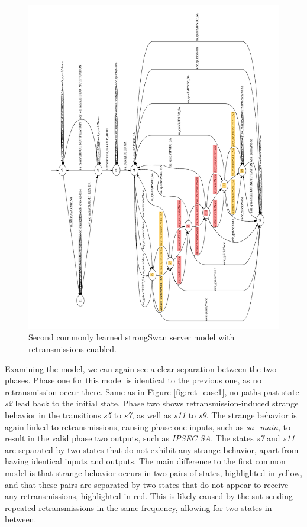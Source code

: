 \begin{figure}[H]
	\includegraphics[width=1.1\linewidth]{images/models/retransmissions/retrans_case2_lstar}
	\caption{Second commonly learned strongSwan server model with retransmissions enabled.}
	\label{fig:ret_case2}
\end{figure}

\newpage

Examining the model, we can again see a clear separation between the two phases. Phase one for this model is identical to the previous one, as no retransmission occur there. Same as in Figure \ref{fig:ret_case1}, no paths past state \emph{s2} lead back to the initial state. Phase two shows retransmission-induced strange behavior in the transitions \emph{s5} to \emph{s7}, as well as \emph{s11} to \emph{s9}. The strange behavior is again linked to retransmissions, causing phase one inputs, such as \emph{sa\_main}, to result in the valid phase two outputs, such as \emph{IPSEC SA}. The states \emph{s7} and \emph{s11} are separated by two states that do not exhibit any strange behavior, apart from having identical inputs and outputs. The main difference to the first common model is that strange behavior occurs in two pairs of states, highlighted in yellow, and that these pairs are separated by two states that do not appear to receive any retransmissions, highlighted in red. This is likely caused by the \ac{sut} sending repeated retransmissions in the same frequency, allowing for two states in between. 



